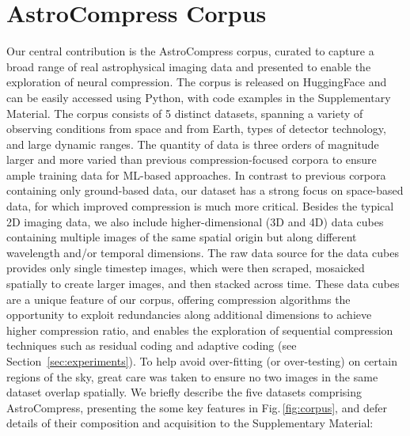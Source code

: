 \section{AstroCompress Corpus}\label{sec:corpus}

Our central contribution is the AstroCompress corpus, curated to capture a broad range of real astrophysical imaging data and presented to enable the exploration of neural compression.
The corpus is released on HuggingFace and can be easily accessed using Python, with code examples in the Supplementary Material. 
The corpus consists of 5 distinct datasets, spanning a variety of observing conditions from space and from Earth, types of detector technology, and large dynamic ranges.
The quantity of data is three orders of magnitude larger and more varied than previous compression-focused corpora \citep{pata2015astronomical,maireles2023efficient} to ensure ample training data for ML-based approaches. In contrast to previous corpora containing only ground-based data, our dataset has a strong focus on space-based data, for which improved compression is much more critical.
Besides the typical 2D imaging data, we also include higher-dimensional (3D and 4D) data cubes containing multiple images of the same spatial origin but along different wavelength and/or temporal dimensions. The raw data source for the data cubes provides only single timestep images, which were then scraped, mosaicked spatially to create larger images, and then stacked across time.
These data cubes are a unique feature of our corpus, offering compression algorithms the opportunity to exploit redundancies along additional dimensions to achieve higher compression ratio, and enables the exploration of sequential compression techniques such as residual coding and adaptive coding (see Section~\ref{sec:experiments}). To help avoid over-fitting (or over-testing) on certain regions of the sky, great care was taken to ensure no two images in the same dataset overlap spatially. We briefly describe the five datasets comprising AstroCompress, presenting the some key features in Fig.\,\ref{fig:corpus}, and defer details of their composition and acquisition to the Supplementary Material:


